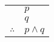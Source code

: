 \documentclass{standalone}
\begin{document}
\begin{tabular}{rl}
    & $p$ \\
    & $q$ \\
    \hline
    $\therefore$ & $p \land q$
\end{tabular}
\end{document}
